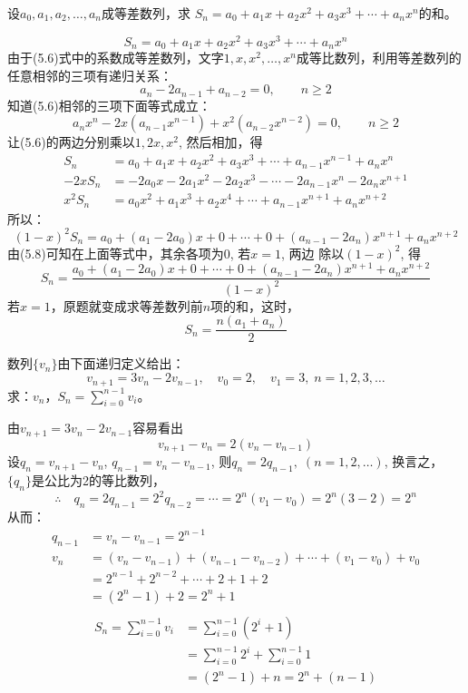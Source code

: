 \begin{example}
设$a_0,a_1,a_2,\ldots,a_n$成等差数列，求
$S_n=a_0+a_1x+a_2x^2+a_3x^3+\cdots+a_nx^n$的和。    
\end{example}

\begin{solution}
    \begin{equation}
        S_n=a_0+a_1x+a_2x^2+a_3x^3+\cdots+a_nx^n
    \end{equation}
由于(5.6)式中的系数成等差数列，文字$1,x,x^2,\ldots,x^n$成等比数列，利用等差数列的任意相邻的三项有递归关系：
\begin{equation}
    a_n-2a_{n-1}+a_{n-2}=0,\qquad n\ge 2
\end{equation}
知道(5.6)相邻的三项下面等式成立：
\begin{equation}
    a_nx^n-2x(a_{n-1}x^{n-1})+x^2(a_{n-2}x^{n-2})=0,\qquad n\ge 2
\end{equation}
让(5.6)的两边分别乘以$1,2x,x^2$, 然后相加，得
\[\begin{split}
    S_n&=a_0+a_1x+a_2x^2+a_3x^3+\cdots+a_{n-1}x^{n-1}+a_nx^n\\
    -2xS_n&=-2a_0x-2a_1x^2-2a_2x^3-\cdots-2a_{n-1}x^n-2a_nx^{n+1}\\
    x^2S_n&=a_0x^2+a_1x^3+a_2x^4+\cdots+a_{n-1}x^{n+1}+a_nx^{n+2}
\end{split}\]
所以：
\[(1-x)^2 S_n=a_0+(a_1-2a_0)x+0+\cdots+0+(a_{n-1}-2a_n)x^{n+1}+a_nx^{n+2}\]
由(5.8)可知在上面等式中，其余各项为0, 若$x=1$, 两边
除以$(1-x)^2$, 得
\[S_n=\frac{a_0+(a_1-2a_0)x+0+\cdots+0+(a_{n-1}-2a_n)x^{n+1}+a_nx^{n+2}}{(1-x)^2}\]
若$x=1$，原题就变成求等差数列前$n$项的和，这时，
\[S_n=\frac{n(a_1+a_n)}{2}\]
\end{solution}

\begin{example}
    数列$\{v_n\}$由下面递归定义给出：
 \[   v_{n+1}=3v_n-2v_{n-1},\quad v_0=2,\quad v_1=3,\; n=1,2,3,\ldots\]
 求：$v_n$，$S_n=\sum^{n-1}_{i=0}v_i$。
\end{example}

\begin{solution}
    由$v_{n+1}=3v_n-2v_{n-1}$容易看出
  \[  v_{n+1}-v_{n}=2(v_n-v_{n-1})\]
    设$q_n=v_{n+1}-v_n$, $q_{n-1}=v_n-v_{n-1}$, 则$q_n=2q_{n-1},\; (n=1,2,\ldots)$, 换言之，$\{q_n\}$是公比为2的等比数列，
\[\therefore\quad q_n=2q_{n-1}=2^2q_{n-2}=\cdots=2^n(v_1-v_0)=2^n(3-2)=2^n\]
从而：
\[\begin{split}
    q_{n-1}&=v_n-v_{n-1}=2^{n-1}\\
v_n&=(v_n-v_{n-1})+(v_{n-1}-v_{n-2})+\cdots+(v_1-v_0)+v_0\\
&=2^{n-1}+2^{n-2}+\cdots +2+1+2\\
&=(2^n-1)+2=2^n+1\\
\end{split}\]
\[\begin{split}
    S_n=\sum^{n-1}_{i=0}v_i&=\sum^{n-1}_{i=0}(2^i+1)\\
    &=\sum^{n-1}_{i=0}2^i+\sum^{n-1}_{i=0}1\\
    &=(2^n-1)+n=2^n+(n-1)
\end{split}\]
\end{solution}

